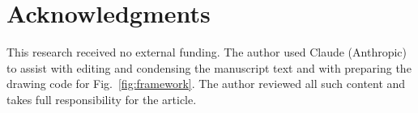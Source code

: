 \documentclass[lettersize,journal]{IEEEtran}
\begin{document}
\section*{Acknowledgments}
This research received no external funding. The author used Claude (Anthropic)
to assist with editing and condensing the manuscript text and with preparing the
drawing code for Fig.~\ref{fig:framework}. The author reviewed all such content
and takes full responsibility for the article.




\end{document}
